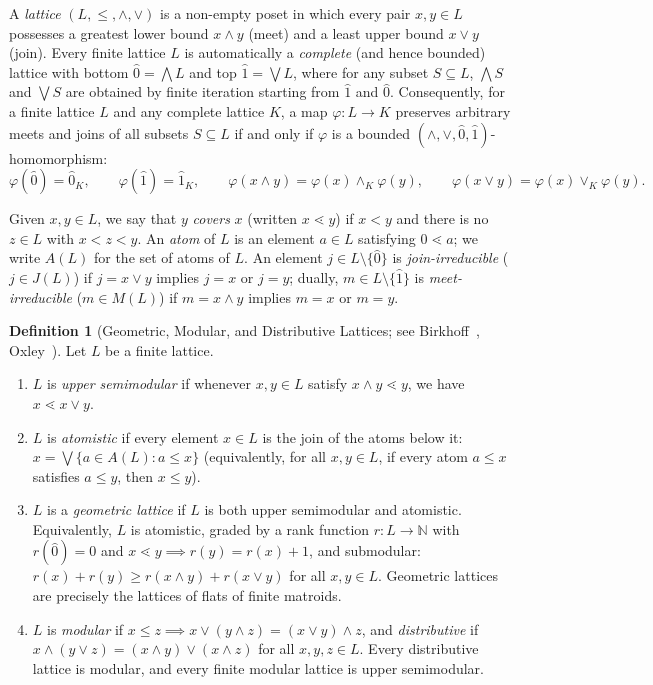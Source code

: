 \documentclass[11pt]{article}
\theoremstyle{definition}
\newtheorem{definition}[theorem]{Definition}
\theoremstyle{remark}
\newcommand{\lessdotcov}{\lessdot}
\begin{document}
A \emph{lattice} $(L, \le, \wedge, \vee)$ is a non-empty poset in which every pair $x, y \in L$ possesses a greatest lower bound $x \wedge y$ (meet) and a least upper bound $x \vee y$ (join). Every finite lattice $L$ is automatically a \emph{complete} (and hence bounded) lattice with bottom $\hat{0} = \bigwedge L$ and top $\hat{1} = \bigvee L$, where for any subset $S \subseteq L$, $\bigwedge S$ and $\bigvee S$ are obtained by finite iteration starting from $\hat{1}$ and $\hat{0}$. Consequently, for a finite lattice $L$ and any complete lattice $K$, a map $\varphi \colon L \to K$ preserves arbitrary meets and joins of all subsets $S \subseteq L$ if and only if $\varphi$ is a bounded $(\wedge, \vee, \hat{0}, \hat{1})$-homomorphism:
\[
  \varphi(\hat{0}) = \hat{0}_K, \qquad
  \varphi(\hat{1}) = \hat{1}_K, \qquad
  \varphi(x \wedge y) = \varphi(x) \wedge_K \varphi(y), \qquad
  \varphi(x \vee y) = \varphi(x) \vee_K \varphi(y).
\]

Given $x, y \in L$, we say that $y$ \emph{covers} $x$ (written $x \lessdotcov y$) if $x < y$ and there is no $z \in L$ with $x < z < y$. An \emph{atom} of $L$ is an element $a \in L$ satisfying $\hat{0} \lessdotcov a$; we write $A(L)$ for the set of atoms of $L$. An element $j \in L \setminus \{\hat{0}\}$ is \emph{join-irreducible} ($j \in J(L)$) if $j = x \vee y$ implies $j = x$ or $j = y$; dually, $m \in L \setminus \{\hat{1}\}$ is \emph{meet-irreducible} ($m \in M(L)$) if $m = x \wedge y$ implies $m = x$ or $m = y$.

\begin{definition}[Geometric, Modular, and Distributive Lattices; see Birkhoff~\cite{Birkhoff1967}, Oxley~\cite{Oxley2011}]
\label{def:geometric}
Let $L$ be a finite lattice.
\begin{enumerate}
\item[(1)] $L$ is \emph{upper semimodular} if whenever $x, y \in L$ satisfy $x \wedge y \lessdotcov y$, we have $x \lessdotcov x \vee y$.
\item[(2)] $L$ is \emph{atomistic} if every element $x \in L$ is the join of the atoms below it: $x = \bigvee \{a \in A(L) : a \le x\}$ (equivalently, for all $x, y \in L$, if every atom $a \le x$ satisfies $a \le y$, then $x \le y$).
\item[(3)] $L$ is a \emph{geometric lattice} if $L$ is both upper semimodular and atomistic. Equivalently, $L$ is atomistic, graded by a rank function $r \colon L \to \mathbb{N}$ with $r(\hat{0})=0$ and $x \lessdotcov y \implies r(y)=r(x)+1$, and submodular: $r(x) + r(y) \ge r(x \wedge y) + r(x \vee y)$ for all $x, y \in L$. Geometric lattices are precisely the lattices of flats of finite matroids.
\item[(4)] $L$ is \emph{modular} if $x \le z \implies x \vee (y \wedge z) = (x \vee y) \wedge z$, and \emph{distributive} if $x \wedge (y \vee z) = (x \wedge y) \vee (x \wedge z)$ for all $x, y, z \in L$. Every distributive lattice is modular, and every finite modular lattice is upper semimodular.
\end{enumerate}
\end{definition}
\end{document}
